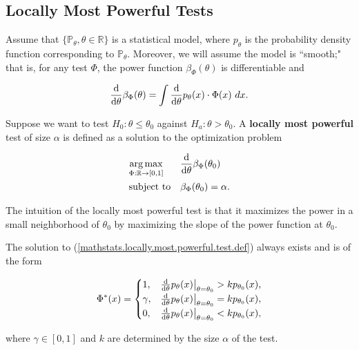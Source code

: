 \subsection{Locally Most Powerful Tests}

\begin{definition}

Assume that \(\{\mathbb{P}_\theta, \theta \in \mathbb{R}\}\) is a statistical model, where \(p_\theta\) is the probability density function corresponding to \(\mathbb{P}_\theta\). Moreover, we will assume the model is ``smooth;" that is, for any test \(\Phi\), the power function \(\beta_\Phi(\theta)\) is differentiable and 

\begin{equation}\label{mathstats.locally.most.powerful.test.cond}
\deriv{}{\theta} \beta_\Phi(\theta) = \int \deriv{}{\theta} p_\theta (x) \cdot \Phi(x) \ dx.
\end{equation}

Suppose we want to test \(H_0: \theta \leq \theta_0\) against \(H_a: \theta > \theta_0\). A \textbf{locally most powerful} test of size \(\alpha\) is defined as a solution to the optimization problem

\begin{equation}\label{mathstats.locally.most.powerful.test.def}
\begin{aligned}
& \underset{\Phi: \mathbb{R} \to [0,1]}{\arg \max}
& & \deriv{}{\theta} \beta_\Phi(\theta_0) \\
& \text{subject to}
& &\beta_\Phi(\theta_0) = \alpha.
\end{aligned}
\end{equation}

\end{definition}

The intuition of the locally most powerful test is that it maximizes the power in a small neighborhood of \(\theta_0\) by maximizing the slope of the power function at \(\theta_0\).

\begin{proposition}

The solution to (\ref{mathstats.locally.most.powerful.test.def}) always exists and is of the form

\[
\Phi^*(x) = \begin{cases}
1, & \deriv{}{\theta} p_\theta(x) \big|_{\theta = \theta_0} > k p_{\theta_0}(x), \\
\gamma, & \deriv{}{\theta} p_\theta(x) \big|_{\theta = \theta_0} = k p_{\theta_0}(x), \\
0,  & \deriv{}{\theta} p_\theta(x) \big|_{\theta = \theta_0} < k p_{\theta_0}(x), 
\end{cases}
\]

where \(\gamma \in [0,1]\) and \(k\) are determined by the size \(\alpha\) of the test.

\end{proposition}

